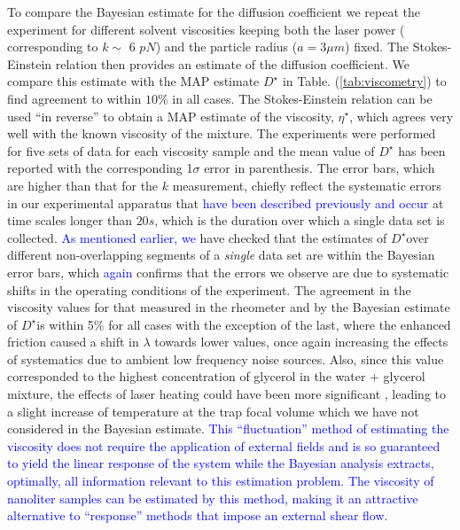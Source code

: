 \documentclass[fleqn,10pt]{wlscirep}
\begin{document}
To compare the Bayesian estimate for the diffusion coefficient we
repeat the experiment for different solvent viscosities keeping both
the laser power ( corresponding to $k\sim$ 6 $pN$) and the particle
radius ($a=3\mu m$) fixed. The Stokes-Einstein relation then provides
an estimate of the diffusion coefficient. We compare this estimate
with the MAP estimate $D^{\star}$ in Table. (\ref{tab:viscometry})
to find agreement to within $10\%$ in all cases. The Stokes-Einstein
relation can be used ``in reverse'' to obtain a MAP estimate of
the viscosity, $\eta^{\star}$, which agrees very well with the known
viscosity of the mixture. The experiments were performed for five
sets of data for each viscosity sample and the mean value of $D^{\star}$
has been reported with the corresponding 1$\sigma$ error in parenthesis.
The error bars, which are higher than that for the $k$ measurement,
chiefly reflect the systematic errors in our experimental apparatus
that \textcolor{blue}{have been described previously and occur} at
time scales longer than $20s$, which is the duration over which a
single data set is collected. \textcolor{blue}{As mentioned earlier,
we} have checked that the estimates of $D^{\star}$over different
non-overlapping segments of a \emph{single }data set are within the
Bayesian error bars, which \textcolor{blue}{again }confirms that the
errors we observe are due to systematic shifts in the operating conditions
of the experiment. The agreement in the viscosity values for that
measured in the rheometer and by the Bayesian estimate of $D^{\star}$is
within 5\% for all cases with the exception of the last, where the
enhanced friction caused a shift in $\lambda$ towards lower values,
once again increasing the effects of systematics due to ambient low
frequency noise sources. Also, since this value corresponded to the
highest concentration of glycerol in the water + glycerol mixture,
the effects of laser heating could have been more significant \cite{schmidt03heating},
leading to a slight increase of temperature at the trap focal volume
which we have not considered in the Bayesian estimate.\textcolor{teal}{{}
}\textcolor{blue}{This ``fluctuation'' method of estimating the
viscosity does not require the application of external fields and
is so guaranteed to yield the linear response of the system while
the Bayesian analysis extracts, optimally, all information relevant
to this estimation problem. The viscosity of nanoliter samples can
be estimated by this method, making it an attractive alternative to
``response'' methods that impose an external shear flow.} 
\end{document}
